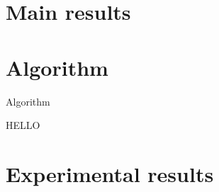 \documentclass{siamart190516}
\begin{document}
\maketitle

\section{Main results}
\label{sec:main}


\section{Algorithm}
\label{sec:alg}

\begin{algorithm}
\caption{Algorithm}
\label{alg:algo}
\begin{algorithmic}
  \STATE HELLO
\end{algorithmic}
\end{algorithm}


\section{Experimental results}
\label{sec:experiments}


% 
% 
\end{document}
